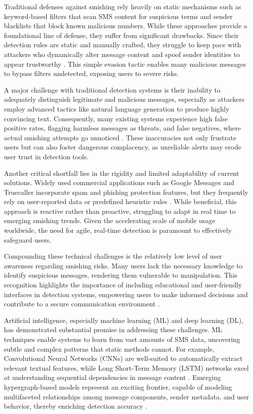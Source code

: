 \documentclass[conference]{IEEEtran}
\begin{document}
Traditional defenses against smishing rely heavily on static mechanisms such as keyword-based filters that scan SMS content for suspicious terms and sender blacklists that block known malicious numbers. While these approaches provide a foundational line of defense, they suffer from significant drawbacks. Since their detection rules are static and manually crafted, they struggle to keep pace with attackers who dynamically alter message content and spoof sender identities to appear trustworthy \cite{ref8,ref9}. This simple evasion tactic enables many malicious messages to bypass filters undetected, exposing users to severe risks.

A major challenge with traditional detection systems is their inability to adequately distinguish legitimate and malicious messages, especially as attackers employ advanced tactics like natural language generation to produce highly convincing text. Consequently, many existing systems experience high false positive rates, flagging harmless messages as threats, and false negatives, where actual smishing attempts go unnoticed \cite{ref10,ref12}. These inaccuracies not only frustrate users but can also foster dangerous complacency, as unreliable alerts may erode user trust in detection tools.

Another critical shortfall lies in the rigidity and limited adaptability of current solutions. Widely used commercial applications such as Google Messages and Truecaller incorporate spam and phishing protection features, but they frequently rely on user-reported data or predefined heuristic rules \cite{ref13}. While beneficial, this approach is reactive rather than proactive, struggling to adapt in real time to emerging smishing trends. Given the accelerating scale of mobile usage worldwide, the need for agile, real-time detection is paramount to effectively safeguard users.

Compounding these technical challenges is the relatively low level of user awareness regarding smishing risks. Many users lack the necessary knowledge to identify suspicious messages, rendering them vulnerable to manipulation. This recognition highlights the importance of including educational and user-friendly interfaces in detection systems, empowering users to make informed decisions and contribute to a secure communication environment \cite{ref2,ref5}. 

Artificial intelligence, especially machine learning (ML) and deep learning (DL), has demonstrated substantial promise in addressing these challenges. ML techniques enable systems to learn from vast amounts of SMS data, uncovering subtle and complex patterns that static methods cannot. For example, Convolutional Neural Networks (CNNs) are well-suited to automatically extract relevant textual features, while Long Short-Term Memory (LSTM) networks excel at understanding sequential dependencies in message content \cite{ref7,ref11}. Emerging hypergraph-based models represent an exciting frontier, capable of modeling multifaceted relationships among message components, sender metadata, and user behavior, thereby enriching detection accuracy \cite{ref12,ref14,ref15}. 
\end{document}
